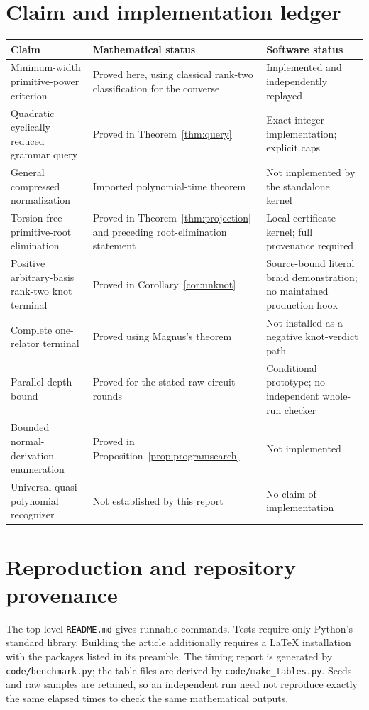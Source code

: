 \documentclass[11pt,letterpaper]{article}
\theoremstyle{definition}
\begin{document}
\section{Claim and implementation ledger}
\label{app:ledger}
\small
\begin{longtable}{p{}p{}p{}}
\toprule
Claim & Mathematical status & Software status \\
\midrule\endhead
Minimum-width primitive-power criterion & Proved here, using classical rank-two classification for the converse & Implemented and independently replayed \\
Quadratic cyclically reduced grammar query & Proved in Theorem~\ref{thm:query} & Exact integer implementation; explicit caps \\
General compressed normalization & Imported polynomial-time theorem & Not implemented by the standalone kernel \\
Torsion-free primitive-root elimination & Proved in Theorem~\ref{thm:projection} and preceding root-elimination statement & Local certificate kernel; full provenance required \\
Positive arbitrary-basis rank-two knot terminal & Proved in Corollary~\ref{cor:unknot} & Source-bound literal braid demonstration; no maintained production hook \\
Complete one-relator terminal & Proved using Magnus's theorem & Not installed as a negative knot-verdict path \\
Parallel depth bound & Proved for the stated raw-circuit rounds & Conditional prototype; no independent whole-run checker \\
Bounded normal-derivation enumeration & Proved in Proposition~\ref{prop:programsearch} & Not implemented \\
Universal quasi-polynomial recognizer & Not established by this report & No claim of implementation \\
\bottomrule
\end{longtable}
\normalsize

\section{Reproduction and repository provenance}
The top-level \texttt{README.md} gives runnable commands. Tests require only
Python's standard library. Building the article additionally requires a
LaTeX installation with the packages listed in its preamble. The timing
report is generated by \texttt{code/benchmark.py}; the table files are derived
by \texttt{code/make\_tables.py}. Seeds and raw samples are retained, so an
independent run need not reproduce exactly the same elapsed times to check
the same mathematical outputs.
\end{document}
